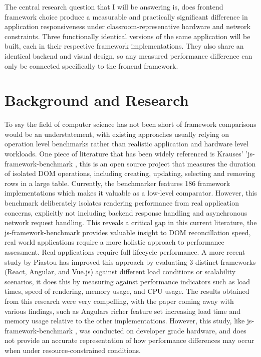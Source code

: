 \documentclass[conference]{IEEEtran}
\begin{document}
\medskip

The central research question that I will be answering is, does frontend framework choice produce a measurable and practically significant difference in application responsiveness under classroom-represenative hardware and network constraints. Three functionally identical versions of the same application will be built, each in their respective framework implementations. They also share an identical backend and visual design, so any measured performance difference can only be connected specifically to the fronend framework. 



\section{Background and Research}

To say the field of computer science has not been short of framework comparisons would be an understatement, with existing approaches usually relying on operation level benchmarks rather than realistic application and hardware level workloads. One piece of literature that has been widely referenced is Krauses' 'js-framework-benchmark \cite{krausestJSFrameworkBenchmark}, this is an open source project that measures the duration of isolated DOM operations, including creating, updating, selecting and removing rows in a large table. Currently, the benchmarker features 186 framework implementations which makes it valuable as a low-level comparator. However, this benchmark deliberately isolates rendering performance from real application concerns, explicitly not including backend response handling and asynchronous network request handling. This reveals a critical gap in this current literature, the js-framework-benchmark provides valuable insight to DOM reconcillation speed, real world applications require a more holistic approach to performance assessment. Real applications require full lifecycle performance. A more recent study by Piastou \cite{piastou2024comprehensive} has improved this approach by evaluating 3 distinct frameworks (React, Angular, and Vue.js) against different load conditions or scalability scenarios, it does this by measuring against performance indicators such as load times, speed of rendering, memory usage, and CPU usage. The results obtained from this research were very compelling, with the paper coming away with various findings, such as Angulars richer feature set increasing load time and memory usage relative to the other implementations. However, this study, like js-framework-benchmark , was conducted on developer grade hardware, and does not provide an accurate representation of how performance differences may occur when under resource-constrained conditions.
\end{document}
